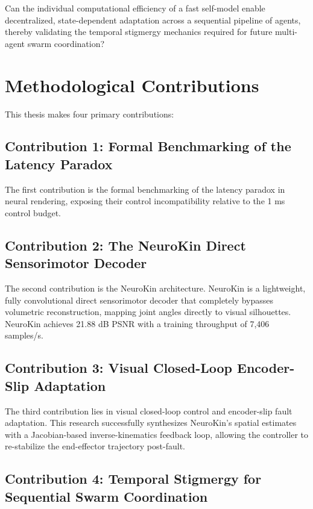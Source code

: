 \documentclass[12pt,a4paper,oneside]{report}
\begin{document}
Can the individual computational efficiency of a fast self-model enable decentralized, state-dependent adaptation across a sequential pipeline of agents, thereby validating the temporal stigmergy mechanics required for future multi-agent swarm coordination?

\section{Methodological Contributions}
\label{sec:methodological_contributions_intro}

This thesis makes four primary contributions:

\subsection{Contribution 1: Formal Benchmarking of the Latency Paradox}

The first contribution is the formal benchmarking of the latency paradox in neural rendering, exposing their control incompatibility relative to the 1 ms control budget.

\subsection{Contribution 2: The NeuroKin Direct Sensorimotor Decoder}

The second contribution is the NeuroKin architecture. NeuroKin is a lightweight, fully convolutional direct sensorimotor decoder that completely bypasses volumetric reconstruction, mapping joint angles directly to visual silhouettes. NeuroKin achieves 21.88 dB PSNR with a training throughput of 7,406 samples/s.

\subsection{Contribution 3: Visual Closed-Loop Encoder-Slip Adaptation}

The third contribution lies in visual closed-loop control and encoder-slip fault adaptation. This research successfully synthesizes NeuroKin's spatial estimates with a Jacobian-based inverse-kinematics feedback loop, allowing the controller to re-stabilize the end-effector trajectory post-fault.

\subsection{Contribution 4: Temporal Stigmergy for Sequential Swarm Coordination}
\end{document}
